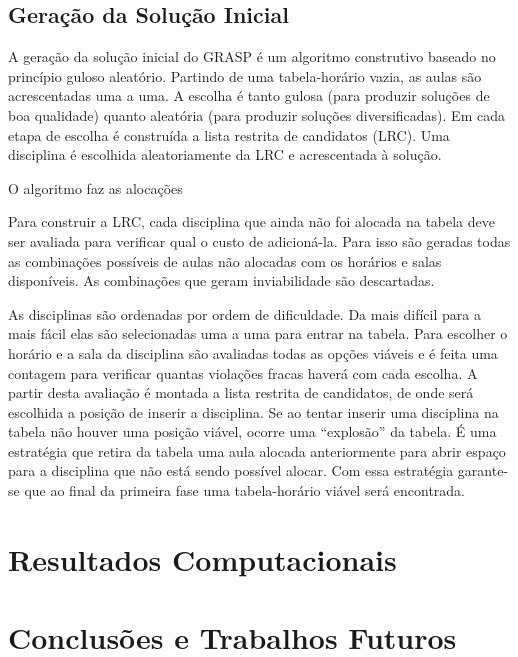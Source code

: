 \documentclass[11pt]{article}
\begin{document}
\subsection{Geração da Solução Inicial}

A geração da solução inicial do GRASP é um algoritmo construtivo baseado no princípio guloso aleatório. Partindo de uma tabela-horário vazia, as aulas são acrescentadas uma a uma. A escolha é tanto gulosa (para produzir soluções de boa qualidade) quanto aleatória (para produzir soluções diversificadas). Em cada etapa de escolha é construída a lista restrita de candidatos (LRC). Uma disciplina é escolhida aleatoriamente da LRC e acrescentada à solução.

O algoritmo faz as alocações 

Para construir a LRC, cada disciplina que ainda não foi alocada na tabela deve ser avaliada para verificar qual o custo de adicioná-la. Para isso são geradas todas as combinações possíveis de aulas não alocadas com os horários e salas disponíveis. As combinações que geram inviabilidade são descartadas. 

As disciplinas são ordenadas por ordem de dificuldade. Da mais difícil para a mais fácil elas são selecionadas uma a uma para entrar na tabela. Para escolher o horário e a sala da disciplina são avaliadas todas as opções viáveis e é feita uma contagem para verificar quantas violações fracas haverá com cada escolha. A partir desta avaliação é montada a lista restrita de candidatos, de onde será escolhida a posição de inserir a disciplina. Se ao tentar inserir uma disciplina na tabela não houver uma posição viável, ocorre uma “explosão” da tabela. É uma estratégia que retira da tabela uma aula alocada anteriormente para abrir espaço para a disciplina que não está sendo possível alocar. Com essa estratégia garante-se que ao final da primeira fase uma tabela-horário viável será encontrada. 
\section{Resultados Computacionais}
\section{Conclusões e Trabalhos Futuros}
\end{document}
